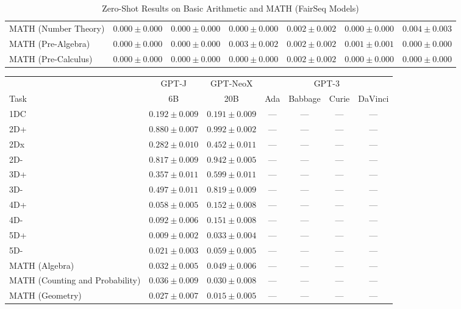 \documentclass[11pt]{article}
\begin{document}
{\begin{landscape}
\begin{table}
\begin{tabular}{l c c c c c c }
MATH (Number Theory) & $0.000 \pm 0.000$ & $0.000 \pm 0.000$ & $0.000 \pm 0.000$ & $0.002 \pm 0.002$ & $0.000 \pm 0.000$ & $0.004 \pm 0.003$ \\ 
MATH (Pre-Algebra) & $0.000 \pm 0.000$ & $0.000 \pm 0.000$ & $0.003 \pm 0.002$ & $0.002 \pm 0.002$ & $0.001 \pm 0.001$ & $0.000 \pm 0.000$ \\ 
MATH (Pre-Calculus) & $0.000 \pm 0.000$ & $0.000 \pm 0.000$ & $0.000 \pm 0.000$ & $0.002 \pm 0.002$ & $0.000 \pm 0.000$ & $0.000 \pm 0.000$ \\ 
\bottomrule 
\end{tabular}
\caption{Zero-Shot Results on Basic Arithmetic and MATH (FairSeq Models)}
\label{tab:math_fairseq}
\end{table}

\begin{table}
\centering 
\begin{tabular}{l c c c c c c } \\ 
& GPT-J & GPT-NeoX & \multicolumn{4}{c}{GPT-3} \\
Task & 6B & 20B & Ada & Babbage & Curie & DaVinci \\ \toprule
1DC & $0.192 \pm 0.009$ & $0.191 \pm 0.009$ & --- & --- & --- & ---  \\ 
2D+ & $0.880 \pm 0.007$ & $0.992 \pm 0.002$ & --- & --- & --- & --- \\ 
2Dx & $0.282 \pm 0.010$ & $0.452 \pm 0.011$ & --- & --- & --- & --- \\ 
2D- & $0.817 \pm 0.009$ & $0.942 \pm 0.005$ & --- & --- & --- & --- \\ 
3D+ & $0.357 \pm 0.011$ & $0.599 \pm 0.011$ & --- & --- & --- & --- \\ 
3D- & $0.497 \pm 0.011$ & $0.819 \pm 0.009$ & --- & --- & --- & --- \\ 
4D+ & $0.058 \pm 0.005$ & $0.152 \pm 0.008$ & --- & --- & --- & --- \\ 
4D- & $0.092 \pm 0.006$ & $0.151 \pm 0.008$ & --- & --- & --- & --- \\ 
5D+ & $0.009 \pm 0.002$ & $0.033 \pm 0.004$ & --- & --- & --- & --- \\ 
5D- & $0.021 \pm 0.003$ & $0.059 \pm 0.005$ & --- & --- & --- & --- \\ 
MATH (Algebra) & $0.032 \pm 0.005$ & $0.049 \pm 0.006$ & --- & --- & --- & --- \\ 
MATH (Counting and Probability) & $0.036 \pm 0.009$ & $0.030 \pm 0.008$& --- & --- & --- & ---  \\ 
MATH (Geometry) & $0.027 \pm 0.007$ & $0.015 \pm 0.005$ & --- & --- & --- & --- \\ 

\end{tabular}
\end{table}
\end{landscape}}
\end{document}
